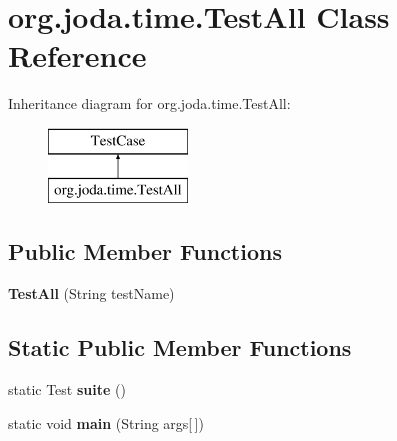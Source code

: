 \hypertarget{classorg_1_1joda_1_1time_1_1_test_all}{\section{org.\-joda.\-time.\-Test\-All Class Reference}
\label{classorg_1_1joda_1_1time_1_1_test_all}
}
Inheritance diagram for org.\-joda.\-time.\-Test\-All\-:\begin{figure}[H]
\begin{center}
\leavevmode
\includegraphics[height=2.000000cm]{classorg_1_1joda_1_1time_1_1_test_all}
\end{center}
\end{figure}
\subsection*{Public Member Functions}
\begin{DoxyCompactItemize}
\item 
\hypertarget{classorg_1_1joda_1_1time_1_1_test_all_abf1b1fffd6ee857396876b184f286038}{{\bfseries Test\-All} (String test\-Name)}\label{classorg_1_1joda_1_1time_1_1_test_all_abf1b1fffd6ee857396876b184f286038}

\end{DoxyCompactItemize}
\subsection*{Static Public Member Functions}
\begin{DoxyCompactItemize}
\item 
\hypertarget{classorg_1_1joda_1_1time_1_1_test_all_a11cc6cfd99ca4bbab80fdd74e118a4d7}{static Test {\bfseries suite} ()}\label{classorg_1_1joda_1_1time_1_1_test_all_a11cc6cfd99ca4bbab80fdd74e118a4d7}

\item 
\hypertarget{classorg_1_1joda_1_1time_1_1_test_all_a199f5cd7536f01279b47061441e06149}{static void {\bfseries main} (String args\mbox{[}$\,$\mbox{]})}\label{classorg_1_1joda_1_1time_1_1_test_all_a199f5cd7536f01279b47061441e06149}

\end{DoxyCompactItemize}



